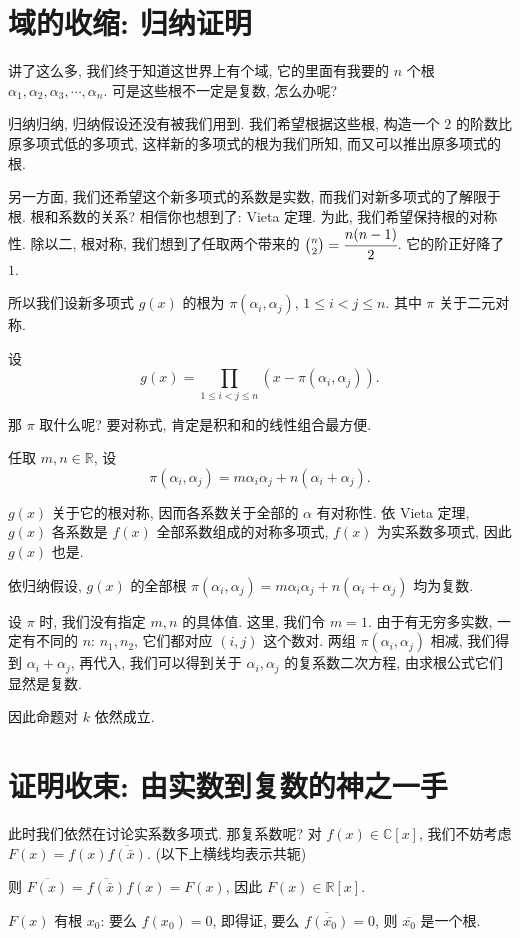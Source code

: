 \documentclass[UTF8,a4paper,12pt]{ctexart}
\begin{document}
\section{域的收缩: 归纳证明}

讲了这么多, 我们终于知道这世界上有个域, 它的里面有我要的 $n$ 个根 $\alpha_1, \alpha_2, \alpha_3, \cdots, \alpha_n$. 可是这些根不一定是复数, 怎么办呢?

归纳归纳, 归纳假设还没有被我们用到. 我们希望根据这些根, 构造一个 $2$ 的阶数比原多项式低的多项式, 这样新的多项式的根为我们所知, 而又可以推出原多项式的根.

另一方面, 我们还希望这个新多项式的系数是实数, 而我们对新多项式的了解限于根. 根和系数的关系? 相信你也想到了: Vieta 定理. 为此, 我们希望保持根的对称性. 除以二, 根对称, 我们想到了任取两个带来的 $\binom n2=\cfrac{n(n-1)}2$. 它的阶正好降了 $1$.

所以我们设新多项式 $g(x)$ 的根为 $\pi(\alpha_i, \alpha_j)$, $1\leq i<j\leq n$. 其中 $\pi$ 关于二元对称.

设
$$
g(x)=\prod_{1\leq i<j\leq n}(x-\pi(\alpha_i, \alpha_j)).
$$

那 $\pi$ 取什么呢? 要对称式, 肯定是积和和的线性组合最方便.

任取 $m, n\in\mathbb{R}$, 设
$$
\pi(\alpha_i, \alpha_j)=m\alpha_i\alpha_j+n(\alpha_i+\alpha_j).
$$

$g(x)$ 关于它的根对称, 因而各系数关于全部的 $\alpha$ 有对称性. 依 Vieta 定理, $g(x)$ 各系数是 $f(x)$ 全部系数组成的对称多项式, $f(x)$ 为实系数多项式, 因此 $g(x)$ 也是.

依归纳假设, $g(x)$ 的全部根 $\pi(\alpha_i, \alpha_j)=m\alpha_i\alpha_j+n(\alpha_i+\alpha_j)$ 均为复数.

设 $\pi$ 时, 我们没有指定 $m, n$ 的具体值. 这里, 我们令 $m=1$. 由于有无穷多实数, 一定有不同的 $n$: $n_1, n_2$, 它们都对应 $(i, j)$ 这个数对. 两组 $\pi(\alpha_i, \alpha_j)$ 相减, 我们得到 $\alpha_i+\alpha_j$, 再代入, 我们可以得到关于 $\alpha_i, \alpha_j$ 的复系数二次方程, 由求根公式它们显然是复数.

因此命题对 $k$ 依然成立.

\section{证明收束: 由实数到复数的神之一手}
此时我们依然在讨论实系数多项式. 那复系数呢?
对 $f(x)\in\mathbb{C}[x]$, 我们不妨考虑 $F(x)=f(x)\overline{f(\bar{x})}$. (以下上横线均表示共轭)

则 $\overline{F(x)}=\overline{f(\bar{x})}f(x)=F(x)$,
因此 $F(x)\in\mathbb{R}[x]$.

$F(x)$ 有根 $x_0$: 要么 $f(x_0)=0$, 即得证, 要么 $\overline{f(\bar{x_0})}=0$, 则 $\bar{x_0}$ 是一个根.



\end{document}
